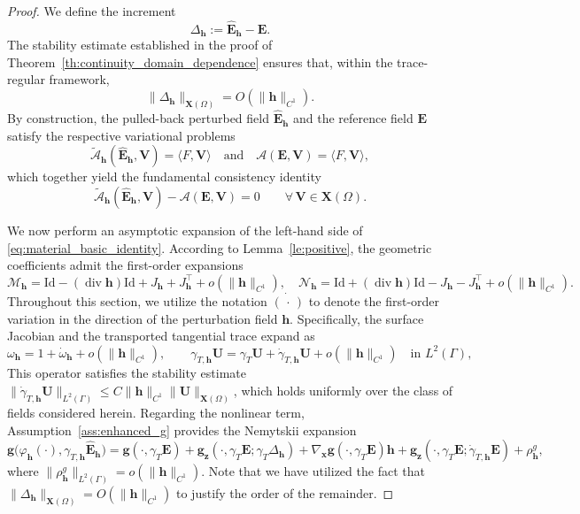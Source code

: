 \documentclass[12pt,reqno]{amsart}
\theoremstyle{definition}
\numberwithin{equation}{section}
\begin{document}
\begin{proof}
We define the increment 
\[
\Delta_{\mathbf{h}} := \hat{\mathbf{E}}_{\mathbf{h}} - \mathbf{E}.
\]
The stability estimate established in the proof of Theorem~\ref{th:continuity_domain_dependence} ensures that, within the trace-regular framework, 
\[
\|\Delta_{\mathbf{h}}\|_{\mathbf{X}(\Omega)} = O(\|\mathbf{h}\|_{C^1}).
\]
By construction, the pulled-back perturbed field $\hat{\mathbf{E}}_{\mathbf{h}}$ and the reference field $\mathbf{E}$ satisfy the respective variational problems
\[
\widetilde{\mathcal{A}}_{\mathbf{h}}(\hat{\mathbf{E}}_{\mathbf{h}}, \mathbf{V}) = \langle {F}, \mathbf{V} \rangle \quad \text{and} \quad \mathcal{A}(\mathbf{E}, \mathbf{V}) = \langle {F}, \mathbf{V} \rangle,
\]
which together yield the fundamental consistency identity
\begin{equation}\label{eq:material_basic_identity}
\widetilde{\mathcal{A}}_{\mathbf{h}}(\hat{\mathbf{E}}_{\mathbf{h}}, \mathbf{V}) - \mathcal{A}(\mathbf{E}, \mathbf{V}) = 0 \qquad \forall \, \mathbf{V} \in \mathbf{X}(\Omega).
\end{equation}

We now perform an asymptotic expansion of the left-hand side of \eqref{eq:material_basic_identity}. According to Lemma~\ref{le:positive}, the geometric coefficients admit the first-order expansions
\[
\mathcal{M}_{\mathbf{h}} = \mathrm{Id} - (\operatorname{div} \mathbf{h})\mathrm{Id} + J_{\mathbf{h}} + J_{\mathbf{h}}^{\top} + o(\|\mathbf{h}\|_{C^1}), \quad \mathcal{N}_{\mathbf{h}} = \mathrm{Id} + (\operatorname{div} \mathbf{h})\mathrm{Id} - J_{\mathbf{h}} - J_{\mathbf{h}}^{\top} + o(\|\mathbf{h}\|_{C^1}).
\]
Throughout this section, we utilize the notation $\dot{(\,\cdot\,)}$ to denote the first-order  variation in the direction of the perturbation field $\mathbf{h}$. Specifically, the surface Jacobian and the transported tangential trace expand as
\[
\omega_{\mathbf{h}} = 1 + \dot{\omega}_{\mathbf{h}} + o(\|\mathbf{h}\|_{C^1}), \qquad \gamma_{T,\mathbf{h}}\mathbf{U} = \gamma_T\mathbf{U} + \dot{\gamma}_{T,\mathbf{h}}\mathbf{U} + o(\|\mathbf{h}\|_{C^1}) \quad \text{in } L^2(\Gamma),
\]
This operator satisfies the stability estimate $\|\dot{\gamma}_{T,\mathbf{h}}\mathbf{U}\|_{L^2(\Gamma)} \le C \|\mathbf{h}\|_{C^1} \|\mathbf{U}\|_{\mathbf{X}(\Omega)}$, which holds uniformly over the class of fields considered herein. Regarding the nonlinear term, Assumption~\ref{ass:enhanced_g} provides the Nemytskii expansion
\[
\mathbf{g}\bigl( \varphi_{\mathbf{h}}(\cdot), \gamma_{T,\mathbf{h}}\hat{\mathbf{E}}_{\mathbf{h}} \bigr) = \mathbf{g}(\cdot, \gamma_T\mathbf{E}) + \mathbf{g}_{\boldsymbol{z}}(\cdot, \gamma_T\mathbf{E}; \gamma_T\Delta_{\mathbf{h}}) + \nabla_{\boldsymbol{x}}\mathbf{g}(\cdot, \gamma_T\mathbf{E})\mathbf{h} + \mathbf{g}_{\boldsymbol{z}}(\cdot, \gamma_T\mathbf{E}; \dot{\gamma}_{T,\mathbf{h}}\mathbf{E}) + \rho_{\mathbf{h}}^{g},
\]
where $\|\rho_{\mathbf{h}}^{g}\|_{L^2(\Gamma)} = o(\|\mathbf{h}\|_{C^1})$. Note that we have utilized the fact that $\|\Delta_{\mathbf{h}}\|_{\mathbf{X}(\Omega)} = O(\|\mathbf{h}\|_{C^1})$ to justify the order of the remainder.


\end{proof}
\end{document}
